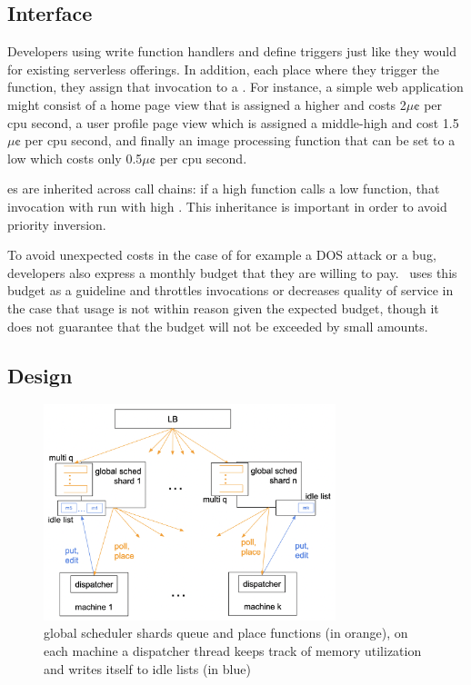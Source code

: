 \subsection{Interface}


Developers using \sys{} write function handlers and define triggers just like
they would for existing serverless offerings. In addition, each place where
they trigger the function, they assign that invocation to a \priceclass{}. For
instance, a simple web application might consist of a home page view that is
assigned a higher \priceclass{} and costs 2$\mu\cent$ per cpu second, a user
profile page view which is assigned a middle-high \class{} and cost
1.5$\mu\cent$ per cpu second, and finally an image processing function that can
be set to a low \class{} which costs only 0.5$\mu\cent$ per cpu second.

\Class{}es are inherited across call chains: if a high \class{} function calls a
low \class{} function, that invocation with run with high \class{}. This
inheritance is important in order to avoid priority inversion.

To avoid unexpected costs in the case of for example a DOS attack or a bug,
developers also express a monthly budget that they are willing to pay.~\Sys{}
uses this budget as a guideline and throttles invocations or decreases quality
of service in the case that usage is not within reason given the expected
budget, though it does not guarantee that the budget will not be exceeded by
small amounts.



\subsection{\Sys{} Design}

\begin{figure}[t]
    \centering
      \includegraphics[width=8.5cm]{img/overview.png}
      \caption{ global scheduler shards queue and place functions (in orange),
      on each machine a dispatcher thread keeps track of memory utilization and
      writes itself to idle lists (in blue) }
    \label{fig:overview}
\end{figure}



